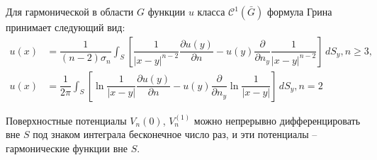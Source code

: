 Для гармонической в области $G$ функции $u$ класса $\mathcal{C}^1 (\bar G)$ формула Грина принимает
следующий вид:
\begin{align*}
  u(x) &= \dfrac{1}{(n-2) \sigma_n} \int_S \left[ 
    \dfrac{1}{|x-y|^{n-2}} \dfrac{\partial u(y)}{\partial n}
    - u(y) \dfrac{\partial }{\partial n_y} \dfrac{1}{|x-y|^{n-2}}\right] \, dS_y, n \geqslant 3, \\
  u(x) &= \dfrac{1}{2\pi} \int_S \left[ 
    \ln \dfrac{1}{|x-y|} \dfrac{\partial u(y)}{\partial n}
    - u(y) \dfrac{\partial }{\partial n_y} \ln \dfrac{1}{|x-y|}\right] \, dS_y, n=2
\end{align*}

Поверхностные потенциалы $V_n{(0)}$, $V_n^{(1)}$ можно непрерывно дифференцировать вне $S$ под
знаком интеграла бесконечное число раз, и эти потенциалы -- гармонические функции вне $S$.

